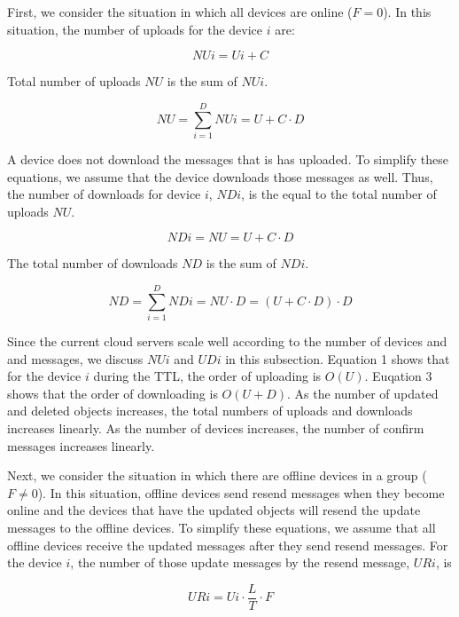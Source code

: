 \documentclass{sig-alternate-05-2015}
\begin{document}
First, we consider the situation in which all devices are online ($F=0$).
In this situation, the number of uploads for the device $i$ are:

\begin{equation}
NUi = Ui + C
\end{equation}

Total number of uploads $NU$ is the sum of $NUi$.

\begin{equation}
NU = \sum_{i = 1}^{D} NUi = U + C \cdot D
\end{equation}

A device does not download the messages that is has uploaded.
To simplify these equations, we assume that the device downloads those messages as well.
Thus, the number of downloads for device $i$, $NDi$, is the equal to the total number of uploads $NU$.

\begin{equation}
NDi = NU = U + C \cdot D
\end{equation}

The total number of downloads $ND$ is the sum of $NDi$.

\begin{equation}
ND = \sum_{i = 1}^{D} NDi = NU \cdot D =  (U + C \cdot D) \cdot D
\end{equation}

Since the current cloud servers scale well according to the number of devices and and messages, we discuss $NUi$ and $UDi$ in this subsection.
Equation 1 shows that for the device $i$ during the TTL, the order of uploading is $O(U)$.
Euqation 3 shows that the order of downloading is $O(U+D)$.
As the number of updated and deleted objects increases, the total numbers of uploads and downloads increases linearly.
As the number of devices increases, the number of confirm messages increases linearly.

Next, we consider the situation in which there are offline devices in a group ($F \neq 0$).
In this situation, offline devices send resend messages when they become online and the devices that have the updated objects will resend the update messages to the offline devices.
To simplify these equations, we assume that all offline devices receive the updated messages after they send resend messages.
For the device $i$, the number of those update messages by the resend message, $URi$, is

\begin{equation}
URi = Ui \cdot \frac{L}{T} \cdot F
\end{equation}
\end{document}
